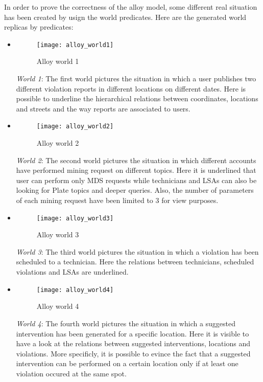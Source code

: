 In order to prove the correctness of the alloy model, some different real situation has been created by usign the world predicates.
Here are the generated world replicas by predicates:
\begin{itemize}
    \item 
        \begin{figure}[H]
            \centering
            \texttt{[image: alloy\_world1]}
            \caption{Alloy world 1}
            \label{fig:alloy_World1}
        \end{figure}
        \textit{World 1}: The first world pictures the situation in which a user publishes two different violation reports in different locations on different dates. Here is possible to underline the hierarchical relations between coordinates, locations and streets and the way reports are associated to users.
    \item 
        \begin{figure}[H]
            \centering
            \texttt{[image: alloy\_world2]}
            \caption{Alloy world 2}
            \label{fig:alloy_World2}
        \end{figure}
        \textit{World 2}: The second world pictures the situation in which different accounts have performed mining request on different topics. Here it is underlined that user can perform only MDS requests while technicians and LSAs can also be looking for Plate topics and deeper queries. Also, the number of parameters of each mining request have been limited to 3 for view purposes.
    \item 
        \begin{figure}[H]
            \centering
            \texttt{[image: alloy\_world3]}
            \caption{Alloy world 3}
            \label{fig:alloy_World3}
        \end{figure}
        \textit{World 3}: The third world pictures the situation in which a violation has been scheduled to a technician. Here the relations between technicians, scheduled violations and LSAs are underlined.
    \item 
        \begin{figure}[H]
            \centering
            \texttt{[image: alloy\_world4]}
            \caption{Alloy world 4}
            \label{fig:alloy_World4}
        \end{figure}
        \textit{World 4}: The fourth world pictures the situation in which a suggested intervention has been generated for a specific location. Here it is visible to have a look at the relations between suggested interventions, locations and violations. More specificly, it is possible to evince the fact that a suggested intervention can be performed on a certain location only if at least one violation occured at the same spot.
\end{itemize}